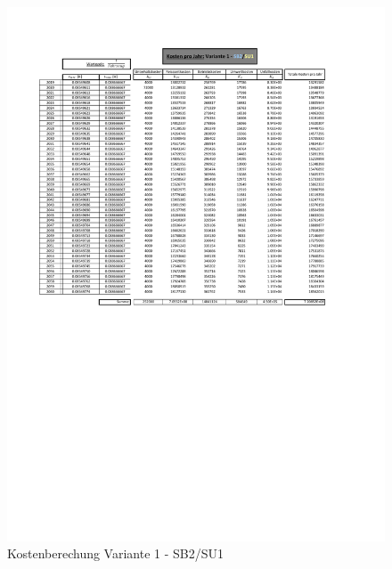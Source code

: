\begin{figure}[h!]
	\centering
	\includegraphics[width=\textwidth]{figures/Anhang/f-00-A-V1-B2-U1}
	\caption{Kostenberechung Variante 1 - SB2/SU1}
\end{figure}

